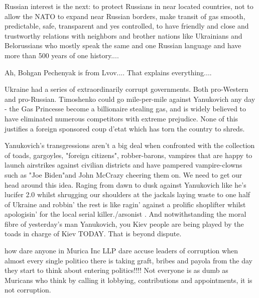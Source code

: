 \begin{itemize}
\begin{itemize}

Russian interest is the next: to protect Russians in near located countries,
not to allow the NATO to expand near Russian borders, make transit of gas
smooth, predictable, safe, transparent and yes controlled, to have friendly and
close and trustworthy relations with neighbors and brother nations like
Ukrainians and Belorussians who mostly speak the same and one Russian language
and have more than 500 years of one history....

Ah, Bohgan Pechenyak is from Lvov.... That explains everything....


Ukraine had a series of extraordinarily corrupt governments. Both pro-Western
and pro-Russian. Timoshenko could go mile-per-mile against Yanukovich any day -
the Gas Princesse become a billionaire stealing gas, and is widely believed to
have eliminated numerous competitors with extreme prejudice. None of this
justifies a foreign sponsored coup d'etat which has torn the country to shreds.


Yanukovich's transgressions aren't a big deal when confronted with the
collection of toads, gargoyles, "foreign citizens", robber-barons, vampires
that are happy to launch airstrikes against civilian districts and have
pampered vampire-clowns such as "Joe Biden"and John McCrazy cheering them on.
We need to get our head around this idea. Raging from dawn to dusk against
Yanukovich like he's lucifer 2.0 whilst shrugging our shoulders at the jackals
laying waste to one half of Ukraine and robbin' the rest is like ragin' against
a prolific shoplifter whilst apologisin' for the local serial killer./arsonist
. And notwithstanding the moral fibre of yesterday's man Yanukovich, you Kiev
people are being played by the toads in charge of Kiev TODAY. That is beyond
dispute.



how dare anyone in Murica Inc LLP dare accuse leaders of corruption when almost
every single politico there is taking graft, bribes and payola from the day
they start to think about entering politics!!!! Not everyone is as dumb as
Muricans who think by calling it lobbying, contributions and appointments, it
is not corruption.

\end{itemize} %



\end{itemize}
